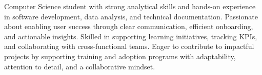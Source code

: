 
\cvparagraph{}

Computer Science student with strong analytical skills and hands-on experience in software development, data analysis, and technical documentation. Passionate about enabling user success through clear communication, efficient onboarding, and actionable insights. Skilled in supporting learning initiatives, tracking KPIs, and collaborating with cross-functional teams. Eager to contribute to impactful projects by supporting training and adoption programs with adaptability, attention to detail, and a collaborative mindset.

